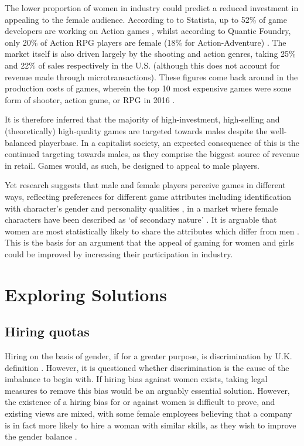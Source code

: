 \documentclass{scrartcl}
\begin{document}
The lower proportion of women in industry could predict a reduced investment in appealing to the female audience. According to to Statista, up to 52\% of game developers are working on Action games \cite{noauthor_game_nodate}, whilst according to Quantic Foundry, only 20\% of Action RPG players are female (18\% for Action-Adventure) \cite{yee_beyond_2017}. The market itself is also driven largely by the shooting and action genres, taking 25\% and 22\% of sales respectively in the U.S. \cite{noauthor_u.s._nodate} (although this does not account for revenue made through microtransactions). These figures come back around in the production costs of games, wherein the top 10 most expensive games were some form of shooter, action game, or RPG in 2016 \cite{statista_expensive_2016}.

It is therefore inferred that the majority of high-investment, high-selling and (theoretically) high-quality games are targeted towards males despite the well-balanced playerbase. In a capitalist society, an expected consequence of this is the continued targeting towards males, as they comprise the biggest source of revenue in retail. Games would, as such, be designed to appeal to male players.

Yet research suggests that male and female players perceive games in different ways, reflecting preferences for different game attributes \cite{yee_beyond_2017} including identification with character's gender and personality qualities \cite{7782511}, in a market where female characters have been described as `of secondary nature' \cite{gonzalez_entering_2014}. It is arguable that women are most statistically likely to share the attributes which differ from men \cite{yee_beyond_2017}. This is the basis for an argument that the appeal of gaming for women and girls could be improved by increasing their participation in industry.

\section{Exploring Solutions}
\subsection{Hiring quotas}
Hiring on the basis of gender, if for a greater purpose, is discrimination by U.K. definition \cite{discrimination}. However, it is questioned whether discrimination is the cause of the imbalance to begin with. If hiring bias against women exists, taking legal measures to remove this bias would be an arguably essential solution. However, the existence of a hiring bias for or against women is difficult to prove, and existing views are mixed, with some female employees believing that a company is in fact more likely to hire a woman with similar skills, as they wish to improve the gender balance \cite{allan_fair_2017}.
\end{document}
